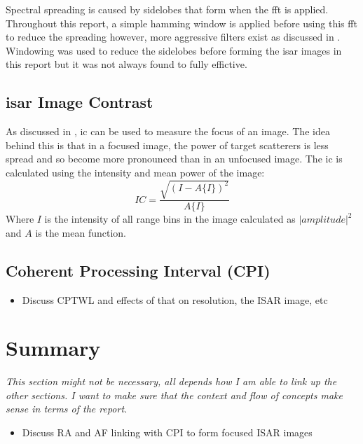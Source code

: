 \documentclass[class=report,11pt,crop=false]{standalone}
\begin{document}
    Spectral spreading is caused by sidelobes that form when the \gls{fft} is applied. Throughout this report, a simple hamming window is applied before using this \gls{fft} to reduce the spreading however, more aggressive filters exist as discussed in \cite{ISARtextbook_Martorella}. Windowing was used to reduce the sidelobes before forming the \gls{isar} images in this report but it was not always found to fully effictive.
    \subsection{\gls{isar} Image Contrast} %
    As discussed in \cite{image_contrast}, \gls{ic} can be used to measure the focus of an image. The idea behind this is that in a focused image, the power of target scatterers is less spread and so become more pronounced than in an unfocused image. The \gls{ic} is calculated using the intensity and mean power of the image:
    \begin{equation} \label{eq:image_contrast}
    IC = \frac{\sqrt{(I-A\{I\})^2}}{A\{I\}}
    \end{equation}
    Where \(I\) is the intensity of all range bins in the image calculated as \(|amplitude|^2\) and \(A\) is the mean function.
    
    \subsection{Coherent Processing Interval (CPI)}
    \begin{itemize}
        \item Discuss CPTWL and effects of that on resolution, the ISAR image, etc
    \end{itemize}

    


\section{Summary}
\emph{This section might not be necessary, all depends how I am able to link up the other sections. I want to make sure that the context and flow of concepts make sense in terms of the report.}
\begin{itemize}
    \item Discuss RA and AF linking with CPI to form focused ISAR images
\end{itemize}



\ifstandalone

\printnoidxglossary[type=\acronymtype,nonumberlist]
\fi
\end{document}
